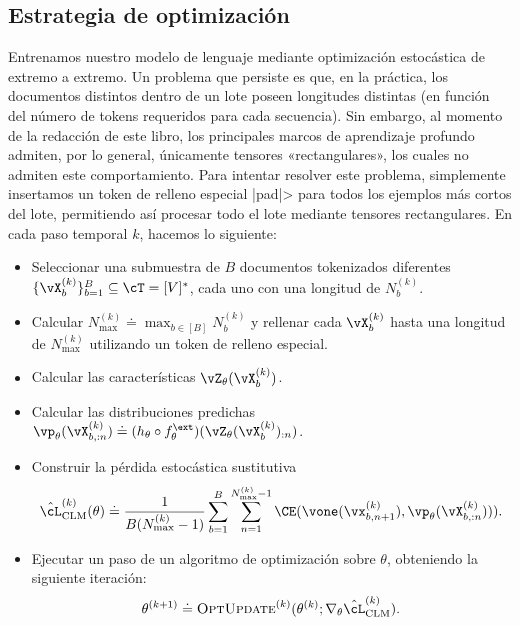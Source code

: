 \documentclass[../../book-main_es.tex]{subfiles}
\begin{document}
\subsection{Estrategia de optimización}

Entrenamos nuestro modelo de lenguaje mediante optimización estocástica de extremo a extremo.
Un problema que persiste es que, en la práctica, los documentos distintos dentro de un lote poseen 
longitudes distintas (en función del número de tokens requeridos para cada secuencia). Sin embargo, 
al momento de la redacción de este libro, los principales marcos de aprendizaje profundo admiten, por 
lo general, únicamente tensores «rectangulares», los cuales no admiten este comportamiento. 
Para intentar resolver este problema, simplemente insertamos un token de relleno especial |pad|> para todos los ejemplos 
más cortos del lote, permitiendo así procesar todo el lote mediante tensores rectangulares.
En cada paso temporal \(k\), hacemos lo siguiente:
\begin{itemize}
\item Seleccionar una submuestra de \(B\) documentos tokenizados diferentes
    \(\{\vX_{b}^{(k)}\}_{b = 1}^{B} \subseteq \cT = [V]^{*}\), cada uno
    con una longitud de \(N_{b}^{(k)}\).
\item Calcular \(N_{\max}^{(k)} \doteq \max_{b \in [B]}N_{b}^{(k)}\)
    y rellenar cada \(\vX_{b}^{(k)}\) hasta una longitud de \(N_{\max}^{(k)}\) utilizando
    un token de relleno especial.
\item Calcular las características \(\vZ_{\theta}(\vX_{b}^{(k)})\).
\item Calcular las distribuciones predichas \(\vp_{\theta}(\vX_{b,
        :n}^{(k)}) \doteq (h_{\theta} \circ
    f_{\theta}^{\ext})(\vZ_{\theta}(\vX_{b}^{(k)})_{:n})\).
\item Construir la pérdida estocástica sustitutiva
    \begin{equation}
        \hat{\cL}_{\mathrm{CLM}}^{(k)}(\theta) \doteq
        \frac{1}{B(N_{\max}^{(k)} - 1)}\sum_{b = 1}^{B}\sum_{n =
        1}^{N_{\max}^{(k)}-1}\CE(\vone(\vx_{b, n + 1}^{(k)}),
    \vp_{\theta}(\vX_{b, :n}^{(k)}))).
\end{equation}
\item Ejecutar un paso de un algoritmo de optimización sobre \(\theta\),
obteniendo la siguiente iteración:
\begin{equation}
    \theta^{(k + 1)} \doteq \textsc{OptUpdate}^{(k)}(\theta^{(k)};
    \nabla_{\theta}\hat{\cL}_{\mathrm{CLM}}^{(k)}).
\end{equation}
\end{itemize}
\end{document}

